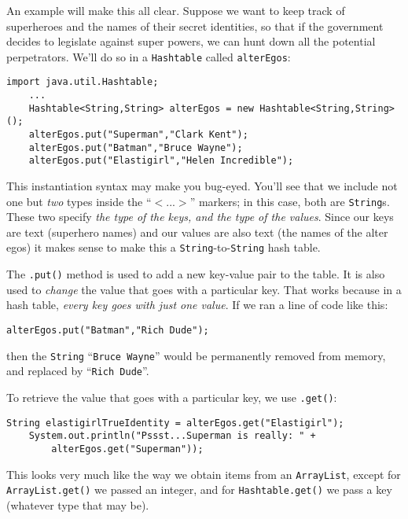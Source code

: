 An example will make this all clear. Suppose we want to keep track of
superheroes and the names of their secret identities, so that if the
government decides to legislate against super powers, we can hunt down all the
potential perpetrators. We'll do so in a \texttt{Hashtable} called
\texttt{alterEgos}:

\begin{Verbatim}[fontsize=\small,samepage=true,frame=single]
    import java.util.Hashtable;
    ...
    Hashtable<String,String> alterEgos = new Hashtable<String,String>();
    alterEgos.put("Superman","Clark Kent");
    alterEgos.put("Batman","Bruce Wayne");
    alterEgos.put("Elastigirl","Helen Incredible");
\end{Verbatim}

This instantiation syntax may make you bug-eyed. You'll see that we include
not one but \textit{two} types inside the ``$<...>$'' markers; in this
case, both are \texttt{String}s. These two specify \textit{the type of the
keys, and the type of the values}. Since our keys are text (superhero names)
and our values are also text (the names of the alter egos) it makes sense to
make this a \texttt{String}-to-\texttt{String} hash table.

The \texttt{.put()} method is used to add a new key-value pair to the table.
It is also used to \textit{change} the value that goes with a particular key.
That works because in a hash table, \textit{every key goes with just one
value}. If we ran a line of code like this:

\begin{Verbatim}[fontsize=\small,samepage=true,frame=single]
    alterEgos.put("Batman","Rich Dude");
\end{Verbatim}

then the \texttt{String} ``\texttt{Bruce Wayne}'' would be permanently removed
from memory, and replaced by ``\texttt{Rich Dude}''.

To retrieve the value that goes with a particular key, we use \texttt{.get()}:

\begin{Verbatim}[fontsize=\small,samepage=true,frame=single]
    String elastigirlTrueIdentity = alterEgos.get("Elastigirl");
    System.out.println("Pssst...Superman is really: " + 
        alterEgos.get("Superman"));
\end{Verbatim}

This looks very much like the way we obtain items from an \texttt{ArrayList},
except for \texttt{ArrayList.get()} we passed an integer, and for
\texttt{Hashtable.get()} we pass a key (whatever type that may be).

